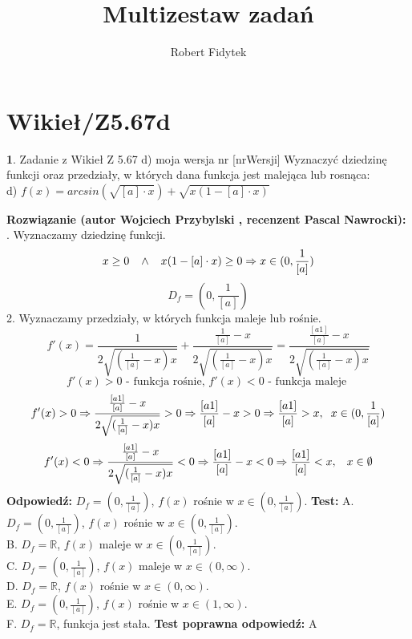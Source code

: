\documentclass[12pt, a4paper]{article}
\title{Multizestaw zadań}
\author{Robert Fidytek}
\date{}
\theoremstyle{definition} %
\newtheorem{zad}{}
\newcommand{\kategoria}[1]{\section{#1}} %
\newcommand{\zadStart}[1]{\begin{zad}#1\newline} %
\newcommand{\zadStop}{\end{zad}}   %
\newcommand{\rozwStart}[2]{\noindent \textbf{Rozwiązanie (autor #1 , recenzent #2): }\newline} %
\newcommand{\rozwStop}{\newline}                                            %
\newcommand{\odpStart}{\noindent \textbf{Odpowiedź:}\newline}    %
\newcommand{\odpStop}{\newline}                                             %
\newcommand{\testStart}{\noindent \textbf{Test:}\newline} %
\newcommand{\testStop}{\newline} %
\newcommand{\kluczStart}{\noindent \textbf{Test poprawna odpowiedź:}\newline} %
\newcommand{\kluczStop}{\newline} %
\begin{document}
\maketitle


\kategoria{Wikieł/Z5.67d}
\zadStart{Zadanie z Wikieł Z 5.67 d) moja wersja nr [nrWersji]}
Wyznaczyć dziedzinę funkcji oraz przedziały, w których dana funkcja jest malejąca lub rosnąca:\\
d) $f(x)=arcsin(\sqrt{[a]\cdot x})+\sqrt{x(1-[a]\cdot x)}$
\zadStop
\rozwStart{Wojciech Przybylski}{Pascal Nawrocki}
1. Wyznaczamy dziedzinę funkcji.
$$x\geq0 \hspace{3mm} \wedge \hspace{3mm} x(1-[a]\cdot x)\geq0 \Rightarrow x\in(0,\frac{1}{[a]})$$
$$D_{f}=(0,\frac{1}{[a]})$$
2. Wyznaczamy przedziały, w których funkcja maleje lub rośnie. 
$$f'(x)=\frac{1}{2\sqrt{(\frac{1}{[a]}-x)x}}+\frac{\frac{1}{[a]}-x}{2\sqrt{(\frac{1}{[a]}-x)x}}=\frac{\frac{[a1]}{[a]}-x}{2\sqrt{(\frac{1}{[a]}-x)x}}$$
$$f'(x)>0 \mbox{ - funkcja rośnie, } f'(x)<0 \mbox{ - funkcja maleje }$$
$$f'(x)>0\Rightarrow \frac{\frac{[a1]}{[a]}-x}{2\sqrt{(\frac{1}{[a]}-x)x}}>0 \Rightarrow \frac{[a1]}{[a]}-x>0 \Rightarrow \frac{[a1]}{[a]}>x,\hspace{2mm} x\in(0,\frac{1}{[a]})$$
$$f'(x)<0\Rightarrow \frac{\frac{[a1]}{[a]}-x}{2\sqrt{(\frac{1}{[a]}-x)x}}<0  \Rightarrow \frac{[a1]}{[a]}-x<0 \Rightarrow \frac{[a1]}{[a]}<x, \hspace{3mm} x\in\emptyset$$
\rozwStop
\odpStart
$D_{f}=(0,\frac{1}{[a]})$, $f(x)$ rośnie w $x\in(0,\frac{1}{[a]})$.
\odpStop
\testStart
A. $D_{f}=(0,\frac{1}{[a]})$, $f(x)$ rośnie w $x\in(0,\frac{1}{[a]})$.\\
B. $D_{f}=\mathbb{R}$, $f(x)$ maleje w $x\in(0,\frac{1}{[a]})$.\\
C. $D_{f}=(0,\frac{1}{[a]})$, $f(x)$ maleje w $x\in(0,\infty)$.\\
D. $D_{f}=\mathbb{R}$, $f(x)$ rośnie w $x\in(0,\infty)$.\\
E. $D_{f}=(0,\frac{1}{[a]})$, $f(x)$ rośnie w $x\in(1,\infty)$.\\
F. $D_{f}=\mathbb{R}$, funkcja jest stała.
\testStop
\kluczStart
A
\kluczStop
\end{document}
